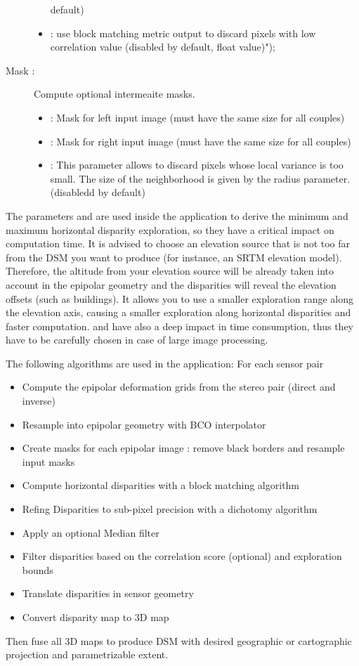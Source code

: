\begin{description}
\begin{itemize}
default)
\item {} : use block matching metric output to discard pixels with low correlation value (disabled by default, float value)");
\end{itemize}
\item[Mask : ] Compute optional intermeaite masks.
\begin{itemize}
 \item {} : Mask for left input image (must have the same size
 for all couples)
 \item {}: Mask for right input image  (must have the same size
 for all couples)
 \item {} : This parameter allows to discard pixels whose
 local variance is too small. The size of the neighborhood is given by the
 radius parameter. (disabledd by default)
\end{itemize}
\end{description}



The parameters  and  are used
inside the application to derive the minimum and maximum horizontal disparity exploration, so they have a critical impact on 
computation time. It is advised to choose an elevation source that is not too far from the
DSM you want to produce (for instance, an SRTM elevation model). Therefore, the altitude 
from your elevation source will be already taken into account in the epipolar geometry
and the disparities will reveal the elevation offsets (such as buildings). It allows you
 to use a smaller exploration range along the elevation axis, causing a smaller exploration
along horizontal disparities and faster computation.
 and  have also a
deep impact in time consumption, thus they have to be carefully chosen in case
of large image processing.



The following algorithms are used in the application:
For each sensor pair
\begin{itemize}
\item Compute the epipolar deformation grids from the stereo pair (direct and
inverse)
\item Resample into epipolar geometry with BCO interpolator
\item Create masks for each epipolar image : remove black borders and resample input masks
\item Compute horizontal disparities with a block matching algorithm
\item Refing Disparities to sub-pixel precision with a dichotomy algorithm
\item Apply an optional Median filter 
\item Filter disparities based on the correlation score (optional) and
exploration bounds
\item Translate disparities in sensor geometry
\item Convert disparity map to 3D map
\end{itemize}

Then fuse all 3D maps to produce DSM with desired geographic or cartographic
projection and parametrizable extent.



